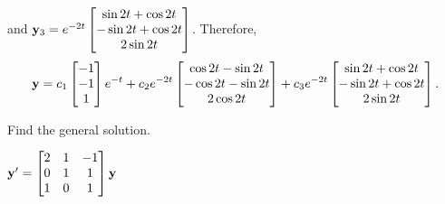 \documentclass{ximera}
\begin{document}
\begin{problem}
\begin{solution}
 and
${\bf y}_3=e^{-2t} \begin{bmatrix}\sin2t+\cos2t\\-\sin2t+\cos2t\\2\sin2t \end{bmatrix}$.
 Therefore,   
$$
{\bf y}=c_1 \begin{bmatrix}-1\\-1\\1 \end{bmatrix}e^{-t}+c_2e^{-2t} \begin{bmatrix}\cos2t-\sin
2t\\-\cos2t-\sin  2t\\2\cos2t \end{bmatrix}+c_3e^{-2t} \begin{bmatrix}
\sin2t+\cos2t\\-\sin2t+\cos2t\\2\sin2t \end{bmatrix}.
$$
\end{solution}
\end{problem}


 \begin{problem}\label{exer:10.6.7}
 Find the general solution.
 
 $ {\bf
y}'= \begin{bmatrix}2&1&-1\\0&1&1\\1&0&1\end{bmatrix}{\bf y}$
\end{problem}
\end{document}
